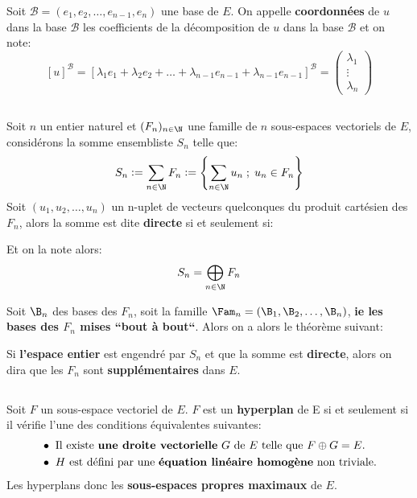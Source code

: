 Soit \(\mathscr{B} = (e_1, e_2, \ldots, e_{n-1}, e_{n})\) une base de \(E\).\+
On appelle \textbf{coordonnées} de \(u\) dans la base \(\mathscr{B}\) les coefficients de la décomposition de \(u\) dans la base \(\mathscr{B}\) et on note:
\[
    [u]^{\mathscr{B}} = [\lambda_1 e_1 + \lambda_2 e_2 + \ldots + \lambda_{n-1} e_{n-1} + \lambda_{n-1} e_{n-1} ]^{\mathscr{B}} = 
    \begin{pmatrix}
        \lambda_1\\
        \vdots\\
        \lambda_{n}
    \end{pmatrix}
\]

\subsection*{}
Soit \(n\) un entier naturel et \((F_n)_{n \in \N}\) une famille de \(n\) sous-espaces vectoriels de \(E\), considérons la somme ensembliste \(S_n\) telle que:
\[
    S_n := \sum_{n\in\N} F_n := \Biggl\{ \sum_{n\in\N} u_n \; ; \; u_n \in F_n\Biggl\}
\]
Soit \((u_1, u_2, \ldots, u_n)\) un n-uplet de vecteurs quelconques du produit cartésien des \(F_n\), alors la somme est dite \textbf{directe} si et seulement si:

Et on la note alors:
\[
    S_n = \bigoplus_{n\in\N} F_n
\]

Soit \(\B_n\) des bases des \(F_n\), soit la famille \(\Fam_n = (\B_1, \B_2, \ldots, \B_n)\), \textbf{ie les bases des \(F_n\) mises ``bout à bout``}.\+
Alors on a alors le théorème suivant:

Si \textbf{l'espace entier} est engendré par \(S_n\) et que la somme est \textbf{directe}, alors on dira que les \(F_n\) sont \textbf{supplémentaires} dans \(E\).
    
\subsection*{}
Soit \(F\) un sous-espace vectoriel de \(E\).\+
\(F\) est un \textbf{hyperplan} de E si et seulement si il vérifie l'une des conditions équivalentes suivantes:
\begin{align*}
    &\bullet \text{ Il existe \textbf{une droite vectorielle} \(G\) de \(E\) telle que \(F \oplus G = E\).} \\
    &\bullet \text{ \(H\) est défini par une \textbf{équation linéaire homogène} non triviale.}
\end{align*}
Les hyperplans donc les \textbf{sous-espaces propres maximaux} de \(E\).

